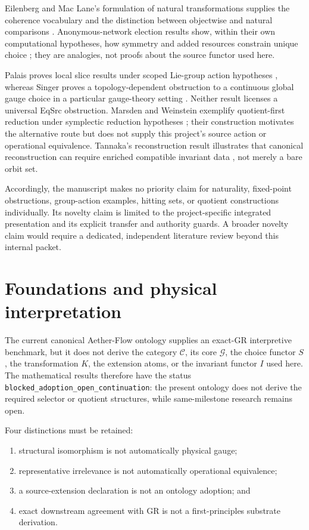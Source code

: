 \documentclass[11pt]{article}
\theoremstyle{definition}
\newcommand{\G}{\mathcal G}
\newcommand{\C}{\mathcal C}
\begin{document}
Eilenberg and Mac Lane's formulation of natural transformations supplies the
coherence vocabulary and the distinction between objectwise and natural
comparisons \cite{eilenberg1945}.  Anonymous-network election results show,
within their own computational hypotheses, how symmetry and added resources
constrain unique choice \cite{angluin1980,itai1981}; they are analogies, not
proofs about the source functor used here.

Palais proves local slice results under scoped Lie-group action hypotheses
\cite{palais1961}, whereas Singer proves a topology-dependent obstruction to a
continuous global gauge choice in a particular gauge-theory setting
\cite{singer1978}.  Neither result licenses a universal EqSrc obstruction.
Marsden and Weinstein exemplify quotient-first reduction under symplectic
reduction hypotheses \cite{marsden1974}; their construction motivates the
alternative route but does not supply this project's source action or
operational equivalence.  Tannaka's reconstruction result illustrates that
canonical reconstruction can require enriched compatible invariant data
\cite{tannaka1939}, not merely a bare orbit set.

Accordingly, the manuscript makes no priority claim for naturality,
fixed-point obstructions, group-action examples, hitting sets, or quotient
constructions individually.  Its novelty claim is limited to the
project-specific integrated presentation and its explicit transfer and
authority guards.  A broader novelty claim would require a dedicated,
independent literature review beyond this internal packet.

\section{Foundations and physical interpretation}

The current canonical Aether-Flow ontology supplies an exact-GR interpretive
benchmark, but it does not derive the category \(\C\), its core \(\G\), the
choice functor \(S\), the transformation \(K\), the extension atoms, or the
invariant functor \(I\) used here.  The mathematical results therefore have
the status \texttt{blocked\_adoption\_open\_continuation}: the present
ontology does not derive the required selector or quotient structures, while
same-milestone research remains open.

Four distinctions must be retained:
\begin{enumerate}
  \item structural isomorphism is not automatically physical gauge;
  \item representative irrelevance is not automatically operational
        equivalence;
  \item a source-extension declaration is not an ontology adoption; and
  \item exact downstream agreement with GR is not a first-principles
        substrate derivation.
\end{enumerate}
\end{document}
